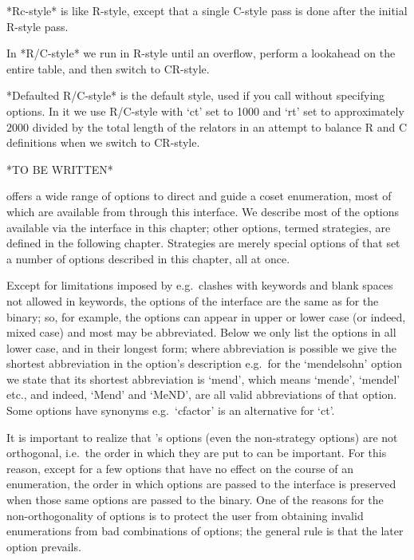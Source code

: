 *Rc-style* is like R-style, except  that a single C-style pass is done
after the initial R-style pass.

In  *R/C-style*  we  run  in  R-style  until  an  overflow, perform  a
lookahead on the entire table, and then switch to CR-style.

*Defaulted R/C-style*  is the default  style, used if  you call {\ACE}
without specifying  options. In it we  use R/C-style with  `ct' set to
1000 and `rt' set to  approximately $2000$ divided by the total length
of the relators  in an attempt to balance R and  C definitions when we
switch to CR-style.


*TO BE WRITTEN*



{\ACE} offers a wide range of options to  direct  and  guide  a  coset
enumeration, most of which are  available  from  {\GAP}  through  this
interface. We describe most of the options available via the interface
in this chapter; other options, termed strategies, are defined in  the
following chapter. Strategies are merely  special  options  of  {\ACE}
that set a number of options described in this chapter, all at once.

Except for limitations imposed by {\GAP}  e.g.\  clashes  with  {\GAP}
keywords and blank spaces not allowed in keywords, the options of  the
{\ACE} interface are the same as for the binary; so, for example,  the
options can appear in upper or lower case (or indeed, mixed case)  and
most may be abbreviated. Below we only list the options in  all  lower
case, and in their longest form; where  abbreviation  is  possible  we
give the shortest abbreviation in the  option's  description  e.g.~for
the `mendelsohn' option we state that  its  shortest  abbreviation  is
`mend', which means `mende', `mendel' etc.,  and  indeed,  `Mend'  and
`MeND', are all valid abbreviations of that option. Some options  have
synonyms e.g.~`cfactor' is an alternative for `ct'.

It  is  important  to  realize  that  {\ACE}'s   options   (even   the
non-strategy options) are not orthogonal, i.e.\  the  order  in  which
they are put to {\ACE} can be important. For this reason, except for a
few options that have no effect on the course of an  enumeration,  the
order in which options are passed to the {\ACE} interface is preserved
when those same options are passed to the {\ACE} binary.  One  of  the
reasons for the non-orthogonality of options is to  protect  the  user
from obtaining invalid enumerations from bad combinations of  options;
the general rule is that the later option prevails.

